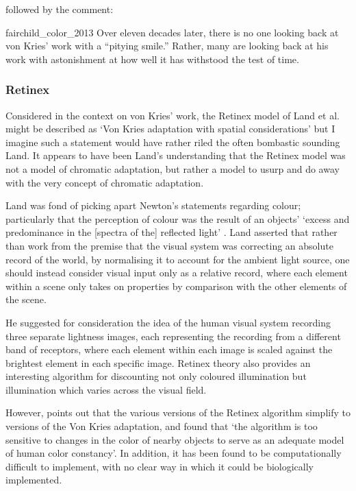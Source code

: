 followed by the comment:

\begin{citequote}{fairchild_color_2013}
Over eleven decades later, there is no one looking back at von Kries’ work
with a “pitying smile.” Rather, many are looking back at his work with
astonishment at how well it has withstood the test of time.
\end{citequote}

\subsubsection{Retinex}

Considered in the context on von Kries' work, the Retinex model of Land et al. \citep{land_retinex_1964,land_lightness_1971,land_recent_1983,land_recent_1986,mccann_quantitative_1976} might be described as `Von Kries adaptation with spatial considerations' but I imagine such a statement would have rather riled the often bombastic sounding Land. It appears to have been Land's understanding that the Retinex model was not a model of chromatic adaptation, but rather a model to usurp and do away with the very concept of chromatic adaptation.

Land was fond of picking apart Newton's statements regarding colour; particularly that the perception of colour was the result of an objects' `excess and predominance in the [spectra of the] reflected light' \citep{newton_opticks_1704}. Land asserted that rather than work from the premise that the visual system was correcting an absolute record of the world, by normalising it to account for the ambient light source, one should instead consider visual input only as a relative record, where each element within a scene only takes on properties by comparison with the other elements of the scene. 

He suggested for consideration the idea of the human visual system recording three separate lightness images, each representing the recording from a different band of receptors, where each element within each image is scaled against the brightest element in each specific image. Retinex theory also provides an interesting algorithm for discounting not only coloured illumination but illumination which varies across the visual field.

However, \citet{barnard_practical_1999} points out that the various versions of the Retinex algorithm simplify to versions of the Von Kries adaptation, and \citet{brainard_analysis_1986} found that `the algorithm is too sensitive to changes in the color of nearby objects to serve as an adequate model of human color constancy'. In addition, it has been found to be computationally difficult to implement, with no clear way in which it could be biologically implemented.

